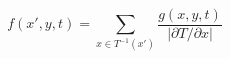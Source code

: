 \begin{equation}
f(x',y,t) = \sum_{x\in T^{-1}(x')} 
            \frac{g(x,y,t)}{|\partial T/\partial x|}
\label{eq12}
\end{equation}

